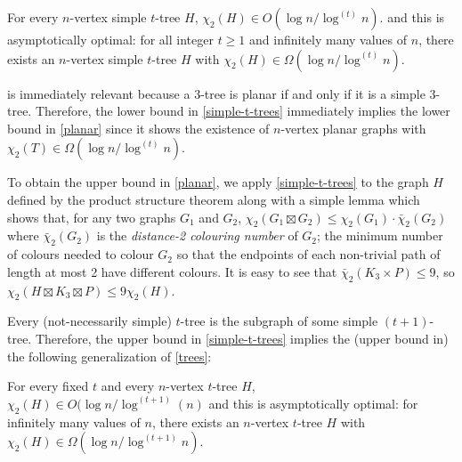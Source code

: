 \documentclass[kpfonts]{patmorin}
\newcommand{\trn}{\chi_2}
\newcommand{\dtcn}{\bar{\chi}_2}
\theoremstyle{named}
\begin{document}
\begin{thm}\label{simple-t-trees}
    For every $n$-vertex simple $t$-tree $H$, $\trn(H) \in O(\log n/\log^{(t)}n)$.
    and this is asymptotically optimal: for all integer $t\ge 1$ and infinitely many values of $n$, there exists an $n$-vertex simple $t$-tree $H$ with $\trn(H)\in\Omega(\log n/\log^{(t)} n)$.
\end{thm}

 is immediately relevant because a 3-tree is planar if and only if it is a simple $3$-tree. Therefore, the lower bound in \cref{simple-t-trees} immediately implies the lower bound in \cref{planar} since it shows the existence of $n$-vertex planar graphs with $\trn(T)\in\Omega(\log n/\log^{(t)} n)$.

To obtain the upper bound in \cref{planar}, we apply \cref{simple-t-trees} to the graph $H$ defined by the product structure theorem along with a simple lemma which shows that, for any two graphs $G_1$ and $G_2$, $\trn(G_1\boxtimes G_2)\le \trn(G_1)\cdot\dtcn(G_2)$ where $\dtcn(G_2)$ is the \emph{distance-2 colouring number} of $G_2$;  the minimum number of colours needed to colour $G_2$ so that the endpoints of each non-trivial path of length at most 2 have different colours.  It is easy to see that $\dtcn(K_3\times P)\le 9$, so $\trn(H\boxtimes K_3\boxtimes P)\le 9\trn(H)$.

%
%


Every (not-necessarily simple) $t$-tree is the subgraph of some simple $(t+1)$-tree. Therefore, the upper bound in \cref{simple-t-trees} implies the (upper bound in) the following generalization of \cref{trees}:

\begin{thm}\label{t-trees}
    For every fixed $t$ and every $n$-vertex $t$-tree $H$, $\trn(H) \in O(\log n/\log^{(t+1)}(n)$ and this is asymptotically optimal: for infinitely many values of $n$, there exists an $n$-vertex $t$-tree $H$ with $\trn(H)\in\Omega(\log n/\log^{(t+1)} n)$.
\end{thm}
\end{document}
